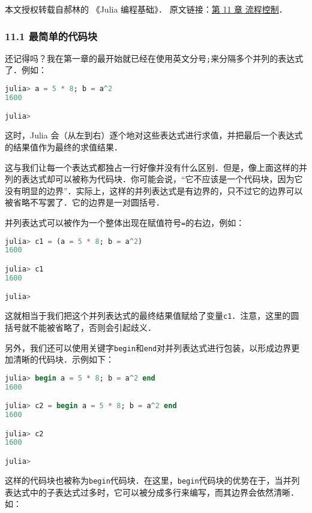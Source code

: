 
本文授权转载自郝林的 《Julia 编程基础》． 原文链接：\href{https://github.com/hyper0x/JuliaBasics/blob/master/book/ch11.md}{第 11 章 流程控制}．

\subsubsection{11.1 最简单的代码块}

还记得吗？我在第一章的最开始就已经在使用英文分号\verb|;|来分隔多个并列的表达式了．例如：

\begin{lstlisting}[language=julia]
julia> a = 5 * 8; b = a^2
1600

julia> 
\end{lstlisting}

这时，Julia 会（从左到右）逐个地对这些表达式进行求值，并把最后一个表达式的结果值作为最终的求值结果．

这与我们让每一个表达式都独占一行好像并没有什么区别．但是，像上面这样的并列的表达式却可以被称为代码块．你可能会说，“它不应该是一个代码块，因为它没有明显的边界”．实际上，这样的并列表达式是有边界的，只不过它的边界可以被省略不写罢了．它的边界是一对圆括号．

并列表达式可以被作为一个整体出现在赋值符号\verb|=|的右边，例如：

\begin{lstlisting}[language=julia]
julia> c1 = (a = 5 * 8; b = a^2)
1600

julia> c1
1600

julia> 
\end{lstlisting}

这就相当于我们把这个并列表达式的最终结果值赋给了变量\verb|c1|．注意，这里的圆括号就不能被省略了，否则会引起歧义．

另外，我们还可以使用关键字\verb|begin|和\verb|end|对并列表达式进行包装，以形成边界更加清晰的代码块．示例如下：

\begin{lstlisting}[language=julia]
julia> begin a = 5 * 8; b = a^2 end
1600

julia> c2 = begin a = 5 * 8; b = a^2 end
1600

julia> c2
1600

julia> 
\end{lstlisting}

这样的代码块也被称为\verb|begin|代码块．在这里，\verb|begin|代码块的优势在于，当并列表达式中的子表达式过多时，它可以被分成多行来编写，而其边界会依然清晰．如：

